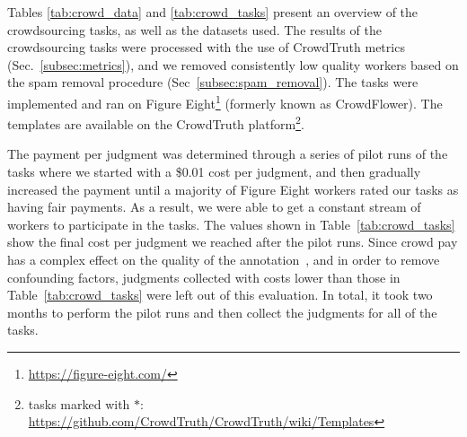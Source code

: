 Tables \ref{tab:crowd_data} and \ref{tab:crowd_tasks} present an overview of the crowdsourcing tasks, as well as the datasets used. The results of the crowdsourcing tasks were processed with the use of CrowdTruth metrics (Sec.~\ref{subsec:metrics}), and we removed consistently low quality workers based on the spam removal procedure (Sec~\ref{subsec:spam_removal}). The tasks were implemented and ran on Figure Eight\footnote{\url{https://figure-eight.com/}} (formerly known as CrowdFlower). The templates are available on the CrowdTruth platform\footnote{tasks marked with $*$: \url{https://github.com/CrowdTruth/CrowdTruth/wiki/Templates}}.

\begin{table}[!htp]
	\caption{Crowdsourcing task data.}
    \label{tab:crowd_tasks}
\end{table}

The payment per judgment was determined through a series of pilot runs of the tasks where we started with a \$0.01 cost per judgment, and then gradually increased the payment until a majority of Figure Eight workers rated our tasks as having fair payments. As a result, we were able to get a constant stream of workers to participate in the tasks. The values shown in Table~\ref{tab:crowd_tasks} show the final cost per judgment we reached after the pilot runs. Since crowd pay has a complex effect on the quality of the annotation~\cite{mao2013volunteering}, and in order to remove confounding factors, judgments collected with costs lower than those in Table~\ref{tab:crowd_tasks} were left out of this evaluation. In total, it took two months to perform the pilot runs and then collect the judgments for all of the tasks.

